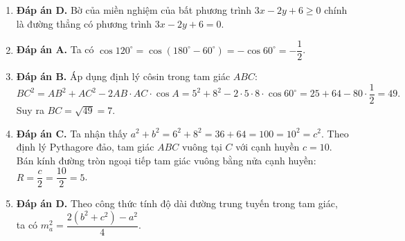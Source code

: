 \documentclass[12pt,a4paper]{article}
\begin{document}
\begin{enumerate}[label=\textbf{Câu \arabic*.},leftmargin=1.1cm]
\item \textbf{Đáp án D.}
Bờ của miền nghiệm của bất phương trình $3x - 2y + 6 \ge 0$ chính là đường thẳng có phương trình $3x - 2y + 6 = 0$.

\item \textbf{Đáp án A.}
Ta có $\cos 120^\circ = \cos(180^\circ - 60^\circ) = -\cos 60^\circ = -\dfrac{1}{2}$.

\item \textbf{Đáp án B.}
Áp dụng định lý côsin trong tam giác $ABC$:
\[
BC^2 = AB^2 + AC^2 - 2AB \cdot AC \cdot \cos A = 5^2 + 8^2 - 2 \cdot 5 \cdot 8 \cdot \cos 60^\circ = 25 + 64 - 80 \cdot \dfrac{1}{2} = 49.
\]
Suy ra $BC = \sqrt{49} = 7$.

\item \textbf{Đáp án C.}
Ta nhận thấy $a^2 + b^2 = 6^2 + 8^2 = 36 + 64 = 100 = 10^2 = c^2$.
Theo định lý Pythagore đảo, tam giác $ABC$ vuông tại $C$ với cạnh huyền $c = 10$.
Bán kính đường tròn ngoại tiếp tam giác vuông bằng nửa cạnh huyền: $R = \dfrac{c}{2} = \dfrac{10}{2} = 5$.

\item \textbf{Đáp án D.}
Theo công thức tính độ dài đường trung tuyến trong tam giác, ta có $m_a^2 = \dfrac{2(b^2 + c^2) - a^2}{4}$.
\end{enumerate}
\end{document}
